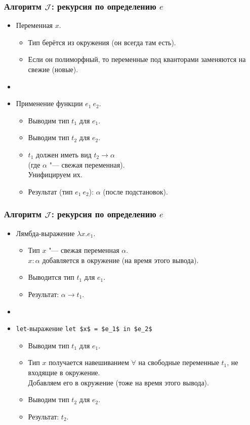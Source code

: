 \documentclass[11pt]{beamer}
\begin{document}
\begin{frame}[fragile]
\frametitle{Алгоритм $\mathcal{J}$: рекурсия по определению $e$}
\begin{itemize}
    \item Переменная $x$.
    \pause
    \begin{itemize}
        \item Тип берётся из окружения (он всегда там есть). 
        \item Если он полиморфный, то переменные под кванторами заменяются на свежие (новые).
    \end{itemize}
    \pause
    \item[]
    \item Применение функции $e_1~e_2$.
    \pause
    \begin{itemize}
        \item Выводим тип $t_1$ для $e_1$.
        \item Выводим тип $t_2$ для $e_2$.
        \item $t_1$ должен иметь вид $t_2 \to \alpha$ \\(где $\alpha$ "--- свежая переменная).
        \\Унифицируем их.
        \item Результат (тип $e_1~e_2$): \pause $\alpha$ (после подстановок).
    \end{itemize}
\end{itemize}
\end{frame}

\begin{frame}[fragile]
\frametitle{Алгоритм $\mathcal{J}$: рекурсия по определению $e$}
\begin{itemize}
    \item Лямбда-выражение $\lambda x.e_1$.
    \pause
    \begin{itemize}
        \item Тип $x$ "--- свежая переменная $\alpha$. \\ $x : \alpha$ добавляется в окружение (на время этого вывода).
        \item Выводится тип $t_1$ для $e_1$.
        \item Результат: \pause $\alpha \to t_1$.
    \end{itemize}
    \pause
    \item[]
    \item \lstinline|let|-выражение \lstinline[mathescape]|let $x$ = $e_1$ in $e_2$|
    \pause
    \begin{itemize}
        \item Выводим тип $t_1$ для $e_1$.
        \item Тип $x$ получается навешиванием $\forall$ на свободные переменные $t_1$, не входящие в окружение.
        \\ Добавляем его в окружение \pause (тоже на время этого вывода).
        \item Выводим тип $t_2$ для $e_2$.
        \item Результат: \pause $t_2$.
    \end{itemize}
\end{itemize}
\end{frame}
\end{document}
